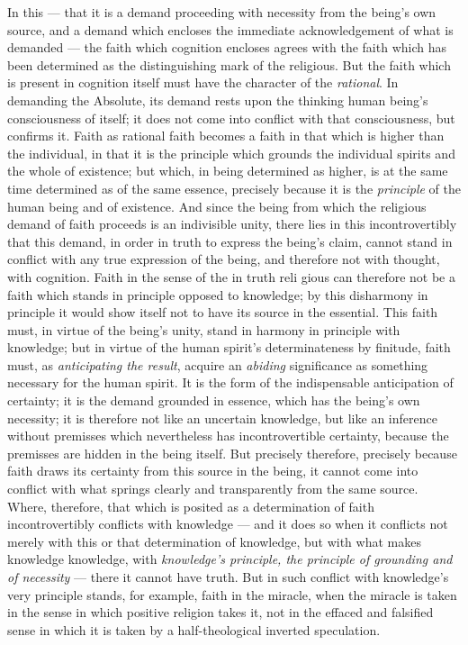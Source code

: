 \documentclass[12pt,a4paper]{book}
\begin{document}
In this --- that it is a demand proceeding with necessity from the being's own
source, and a demand which encloses the immediate acknowledgement of what is
demanded --- the faith which cognition encloses agrees with the faith which
has been determined as the distinguishing mark of the religious. But the faith
which is present in cognition itself must have the character of the
\emph{rational}. In demanding the Absolute, its demand rests upon the thinking
human being's consciousness of itself; it does not come into conflict with
that consciousness, but confirms it. Faith as rational faith becomes a faith
in that which is higher than the individual, in that it is the principle which
grounds the individual spirits and the whole of existence; but which, in being
determined as higher, is at the same time determined as of the same essence,
precisely because it is the \emph{principle} of the human being and of
existence. And since the being from which the religious demand of faith
proceeds is an indivisible unity, there lies in this incontrovertibly that
this demand, in order in truth to express the being's claim, cannot stand in
conflict with any true expression of the being, and therefore not with
thought, with cognition. Faith in the sense of the in truth reli\-%
gious can therefore not be a faith which stands in principle opposed to
knowledge; by this disharmony in principle it would show itself not to have
its source in the essential. This faith must, in virtue of the being's unity,
stand in harmony in principle with knowledge; but in virtue of the human
spirit's determinateness by finitude, faith must, as \emph{anticipating the
result}, acquire an \emph{abiding} significance as something necessary for the
human spirit. It is the form of the indispensable anticipation of certainty;
it is the demand grounded in essence, which has the being's own necessity; it
is therefore not like an uncertain knowledge, but like an inference without
premisses which nevertheless has incontrovertible certainty, because the
premisses are hidden in the being itself. But precisely therefore, precisely
because faith draws its certainty from this source in the being, it cannot
come into conflict with what springs clearly and transparently from the same
source. Where, therefore, that which is posited as a determination of faith
incontrovertibly conflicts with knowledge --- and it does so when it conflicts
not merely with this or that determination of knowledge, but with what makes
knowledge knowledge, with \emph{knowledge's principle, the principle of
grounding and of necessity} --- there it cannot have truth. But in such
conflict with knowledge's very principle stands, for example, faith in the
miracle, when the miracle is taken in the sense in which positive religion
takes it, not in the effaced and falsified sense in which it is taken by a
half-theological inverted speculation.
\end{document}
